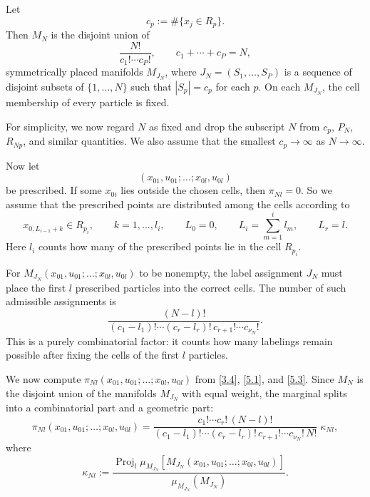 \documentclass[11pt]{article}
\begin{document}
Let
\[
c_p:=\#\{x_j\in R_p\}.
\]
Then $M_N$ is the disjoint union of
\begin{equation}
\frac{N!}{c_1!\cdots c_P!},
\qquad
c_1+\cdots+c_P=N,
\tag{5.1}\label{5.1}
\end{equation}
symmetrically placed manifolds $M_{J_N}$, where $J_N=(S_1,\dots,S_P)$ is a sequence of disjoint subsets of $\{1,\dots,N\}$ such that $|S_p|=c_p$ for each $p$. On each $M_{J_N}$, the cell membership of every particle is fixed.

For simplicity, we now regard $N$ as fixed and drop the subscript $N$ from $c_p$, $P_N$, $R_{Np}$, and similar quantities. We also assume that the smallest $c_p\to\infty$ as $N\to\infty$.

Now let
\[
(x_{01},u_{01};\dots;x_{0l},u_{0l})
\]
be prescribed. If some $x_{0i}$ lies outside the chosen cells, then $\pi_{Nl}=0$. So we assume that the prescribed points are distributed among the cells according to
\begin{equation}
x_{0,L_{i-1}+k}\in R_{p_i},
\qquad
k=1,\dots,l_i,
\qquad
L_0=0,
\qquad
L_i=\sum_{m=1}^i l_m,
\qquad
L_r=l.
\tag{5.2}\label{5.2}
\end{equation}
Here $l_i$ counts how many of the prescribed points lie in the cell $R_{p_i}$.

For $M_{J_N}(x_{01},u_{01};\dots;x_{0l},u_{0l})$ to be nonempty, the label assignment $J_N$ must place the first $l$ prescribed particles into the correct cells. The number of such admissible assignments is
\begin{equation}
\frac{(N-l)!}{(c_1-l_1)!\cdots(c_r-l_r)!\,c_{r+1}!\cdots c_{\nu_N}!}.
\tag{5.3}\label{5.3}
\end{equation}
This is a purely combinatorial factor: it counts how many labelings remain possible after fixing the cells of the first $l$ particles.

We now compute $\pi_{Nl}(x_{01},u_{01};\dots;x_{0l},u_{0l})$ from \eqref{3.4}, \eqref{5.1}, and \eqref{5.3}. Since $M_N$ is the disjoint union of the manifolds $M_{J_N}$ with equal weight, the marginal splits into a combinatorial part and a geometric part:
\begin{equation}
\pi_{Nl}(x_{01},u_{01};\dots;x_{0l},u_{0l})
=
\frac{c_1!\cdots c_r!\,(N-l)!}{(c_1-l_1)!\cdots(c_r-l_r)!\,c_{r+1}!\cdots c_{\nu_N}!\,N!}
\;\kappa_{Nl},
\tag{5.4}\label{5.4}
\end{equation}
where
\[
\kappa_{Nl}
:=
\frac{
\operatorname{Proj}_l\mu_{M_{J_N}}
\!\left[M_{J_N}(x_{01},u_{01};\dots;x_{0l},u_{0l})\right]
}{
\mu_{M_{J_N}}(M_{J_N})
}.
\]
\end{document}
